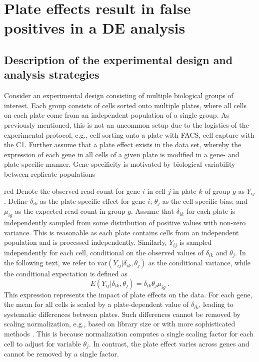 \documentclass[oupdraft]{bio}
\begin{document}
\section{Plate effects result in false positives in a DE analysis}

\subsection{Description of the experimental design and analysis strategies}
Consider an experimental design consisting of multiple biological groups of interest.
Each group consists of cells sorted onto multiple plates, where all cells on each plate come from an independent population of a single group.
As previously mentioned, this is not an uncommon setup due to the logistics of the experimental protocol, e.g., cell sorting onto a plate with FACS, cell capture with the C1.
Further assume that a plate effect exists in the data set, whereby the expression of each gene in all cells of a given plate is modified in a gene- and plate-specific manner.
Gene specificity is motivated by biological variability between replicate populations

\begin{color}{red}
Denote the observed read count for gene $i$ in cell $j$ in plate $k$ of group $g$ as $Y_{ij}$.
Define $\delta_{ik}$ as the plate-specific effect for gene $i$; $\theta_j$ as the cell-specific bias; and $\mu_{ig}$ as the expected read count in group $g$.
Assume that $\delta_{ik}$ for each plate is independently sampled from some distribution of positive values with non-zero variance.
This is reasonable as each plate contains cells from an independent population and is processed independently.
Similarly, $Y_{ij}$ is sampled independently for each cell, conditional on the observed values of $\delta_{ik}$ and $\theta_j$.
In the following text, we refer to $\mbox{var}(Y_{ij}|\delta_{ik},\theta_j)$ as the conditional variance, while the conditional expectation is defined as
\[
    E(Y_{ij}|\delta_{ik},\theta_j) = \delta_{ik}\theta_j\mu_{ig} \;.
\]
This expression represents the impact of plate effects on the data.
For each gene, the mean for all cells is scaled by a plate-dependent value of $\delta_{ik}$, leading to systematic differences between plates.
Such differences cannot be removed by scaling normalization, e.g., based on library size or with more sophisticated methods \citep{anders2010differential,robinson2010scaling}.
This is because normalization computes a single scaling factor for each cell to adjust for variable $\theta_j$.
In contrast, the plate effect varies across genes and cannot be removed by a single factor.
\end{color}
\end{document}

